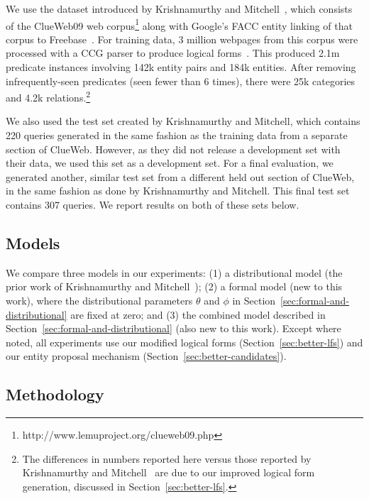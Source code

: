 \documentclass[11pt]{article}
\newcommand{\secref}[1]{Section~\ref{sec:#1}}
\begin{document}
We use the dataset introduced by Krishnamurthy and
Mitchell~, which
consists of the ClueWeb09 web
corpus\footnote{http://www.lemuproject.org/clueweb09.php} along with Google's
FACC entity linking of that corpus to
Freebase~\cite{gabrilovich-2013-clueweb-entity-linking}.  For training data, 3
million webpages from this corpus were processed with a CCG parser to produce
logical forms~\cite{krishnamurthy-2014-joint-ccg}.  This produced 2.1m
predicate instances involving 142k entity pairs and 184k entities.  After
removing infrequently-seen predicates (seen fewer than 6 times), there were 25k
categories and 4.2k relations.\footnote{The differences in numbers reported
here versus those reported by Krishnamurthy and
Mitchell~ are due to our
improved logical form generation, discussed in \secref{better-lfs}.}

We also used the test set created by Krishnamurthy and Mitchell, which contains
220 queries generated in the same fashion as the training data from a separate
section of ClueWeb.  However, as they did not release a development set with
their data, we used this set as a development set.  For a final evaluation, we
generated another, similar test set from a different held out section of
ClueWeb, in the same fashion as done by Krishnamurthy and Mitchell.  This final
test set contains 307 queries.  We report results on both of these sets below.

\subsection{Models}

We compare three models in our experiments: (1) a distributional model (the
prior work of Krishnamurthy and
Mitchell~); (2) a formal
model (new to this work), where the distributional parameters $\theta$ and
$\phi$ in \secref{formal-and-distributional} are fixed at zero; and (3) the
combined model described in \secref{formal-and-distributional} (also new to
this work).  Except where noted, all experiments use our modified logical forms
(\secref{better-lfs}) and our entity proposal mechanism
(\secref{better-candidates}).

\subsection{Methodology}
\end{document}
